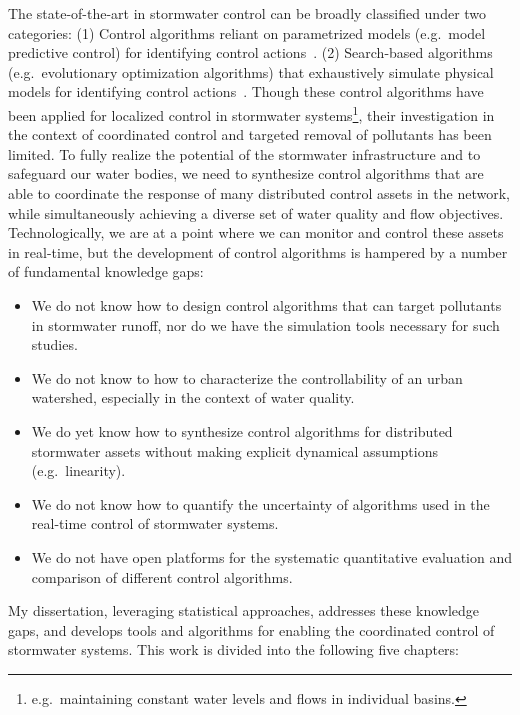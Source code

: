 The state-of-the-art in stormwater control  can be broadly classified under two categories: (1) Control algorithms reliant on parametrized models (e.g.\ model predictive control) for identifying control actions~\cite{Wong_Kerkez_2018, Ocampo-Martinez_2015,joseph2014hybrid, Sun_2020, lund2020cso}. (2) Search-based algorithms (e.g.\ evolutionary optimization algorithms) that exhaustively simulate physical models for identifying control actions~\cite{shishegar2018optimization,sadler2019, lund2018, Rjeily_2018, Meneses_2018, vezzaro2014}.
Though these control algorithms have been applied for localized control in stormwater systems\footnote{e.g.\ maintaining constant water levels and flows in individual basins.}, their investigation in the context of coordinated control and targeted removal of pollutants has been limited.
To fully realize the potential of the stormwater infrastructure and to safeguard our water bodies, we need to synthesize control algorithms that are able to coordinate the response of many distributed control assets in the network, while simultaneously achieving a diverse set of water quality and flow objectives. 
Technologically, we are at a point where we can monitor and control these assets in real-time, but the development of control algorithms is hampered by a number of fundamental knowledge gaps:
\begin{itemize}
	\item We do not know how to design control algorithms that can target pollutants in stormwater runoff, nor do we have the simulation tools necessary for such studies.
	\item We do not know to how to characterize the controllability of an urban watershed, especially in the context of water quality.
	\item We do yet know how to synthesize control algorithms for distributed stormwater assets without making explicit dynamical assumptions (e.g.\ linearity).
	\item We do not know how to quantify the uncertainty of algorithms used in the real-time control of stormwater systems.
	\item We do not have open platforms for the systematic quantitative evaluation and comparison of different control algorithms.
\end{itemize}

My dissertation, leveraging statistical approaches, addresses these knowledge gaps, and develops tools and algorithms for enabling the coordinated control of stormwater systems. This work is divided into the following five chapters:

